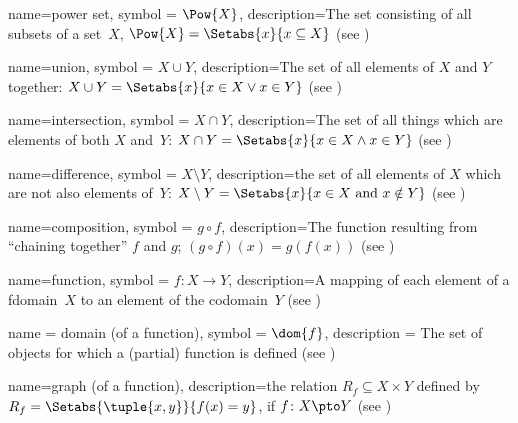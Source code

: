  {
  name=power set,
  symbol = {\ensuremath{\Pow{X}}},  
  description={The set consisting of all \glspl{subset} of a set~$X$,
    $\Pow{X} = \Setabs{x}{x \subseteq X}$ (see
    )} }

 {
  name=union,
  symbol = {\ensuremath{X \cup Y}},
  description={The set of all {element}s of $X$ and $Y$ together: $X
    \cup Y = \Setabs{x}{x \in X \lor x\in Y}$ (see
    )} }

 {
  name=intersection,
  symbol = {\ensuremath{X \cap Y}},
  description={The set of all things which are {element}s of both
    $X$ and~$Y$: $X \cap Y = \Setabs{x}{x \in X \land x\in Y}$ (see
    )} }

 {
  name=difference,
  symbol = {\ensuremath{X \setminus Y}},
  description={the set of all {elements} of $X$ which are not also
  {element}s of~$Y$: $X\setminus Y = \Setabs{x}{x\in X \text{ and }
    x \notin Y}$ (see )} }


 {
  name=composition,
  symbol = {\ensuremath{g \circ f}},  
  description={The function resulting from ``chaining together'' $f$
    and $g$; $(g \circ f)(x) = g(f(x))$ (see
    )} }

 {
  name=function,
  symbol = {\ensuremath{f \colon X \to Y}},
  description={A mapping of each element of a \gls{fdomain}~$X$ to an
    element of the codomain~$Y$ (see )} }

 {
  name = {domain (of a function)},
  symbol = {\ensuremath{\dom{f}}},
  description = {The set of objects for which a (partial) function is
    defined (see )}}


 {
  name=graph (of a function),
  description={the relation $R_f \subseteq X \times Y$ defined by $R_f
    = \Setabs{\tuple{x,y}}{f(x) = y}$, if $f\colon X \pto Y$ (see
    )} }

